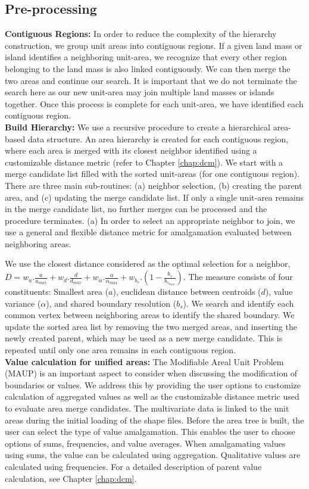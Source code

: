 \subsection{Pre-processing}
\textbf{Contiguous Regions:} In order to reduce the complexity of the hierarchy construction, we group unit areas into contiguous regions. If a given land mass or island identifies a neighboring unit-area, we recognize that every other region belonging to the land mass is also linked contiguously. We can then merge the two areas and continue our search. It is important that we do not terminate the search here as our new unit-area may join multiple land masses or islands together. Once this process is complete for each unit-area, we have identified each contiguous region. \\
\textbf{Build Hierarchy:} We use a recursive procedure to create a hierarchical area-based data structure. An area hierarchy is created for each contiguous region, where each area is merged with its closest neighbor identified using a customizable distance metric (refer to Chapter \ref{chap:dcm}). We start with a merge candidate list filled with the sorted unit-areas (for one contiguous region). There are three main sub-routines: (a) neighbor selection, (b) creating the parent area, and (c) updating the merge candidate list. If only a single unit-area remains in the merge candidate list, no further merges can be processed and the procedure terminates. (a) In order to select an appropriate neighbor to join, we use a general and flexible distance metric for amalgamation evaluated between neighboring areas.

We use the closest distance considered as the optimal selection for a neighbor,
$D = w_a.\frac{a}{a_{max}} + w_d.\frac{d}{d_{max}} + w_\alpha.\frac{\alpha}{\alpha_{max}} + w_{b_s}.(1-\frac{b_s}{b_{s_{max}}})$.
The measure consists of four constituents: Smallest area ($a$), euclidean distance between centroids ($d$), value variance ($\alpha$), and shared boundary resolution ($b_s$). We search and identify each common vertex between neighboring areas to identify the shared boundary. We update the sorted area list by removing the two merged areas, and inserting the newly created parent, which may be used as a new merge candidate. This is repeated until only one area remains in each contiguous region.\\
\textbf{Value calculation for unified areas:} The Modifiable Areal Unit Problem (MAUP) \cite{openshaw1984modifiable} is an important aspect to consider when discussing the modification of boundaries or values. We address this by providing the user options to customize calculation of aggregated values as well as the customizable distance metric used to evaluate area merge candidates. The multivariate data is linked to the unit areas during the initial loading of the shape files. Before the area tree is built, the user can select the type of value amalgamation. This enables the user to choose options of sums,  frequencies, and value averages. When amalgamating values using sums, the value can be calculated using aggregation. Qualitative values are calculated using frequencies. For a detailed description of parent value calculation, see Chapter \ref{chap:dcm}.
